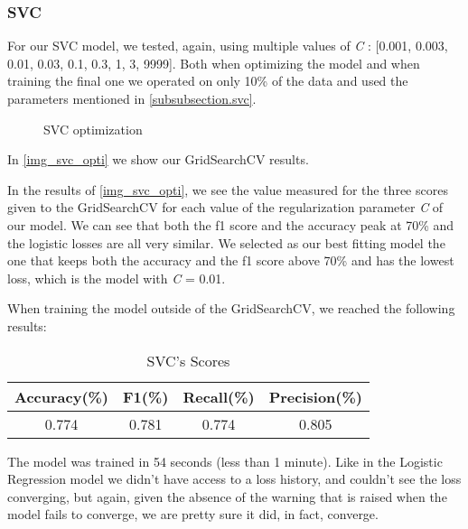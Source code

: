 \documentclass[12pt]{article}
\begin{document}
\subsubsection{SVC}
\label{subsubsection.svc_tunning}
        \par 
        For our SVC model, we tested, again, using multiple values of \textit{C} : [0.001, 0.003, 0.01, 0.03, 0.1, 0.3, 1, 3, 9999].
        Both when optimizing the model and when training the final one we operated on only 10\% of the data and used the parameters mentioned in \autoref{subsubsection.svc}.
    \begin{figure}[!tb]
        \caption{SVC optimization}
        \label{img_svc_opti}
    \end{figure}
        In \autoref{img_svc_opti} we show our GridSearchCV results.
    \par 
        In the results of \autoref{img_svc_opti}, we see the value measured for the three scores given to the GridSearchCV for each value of 
        the regularization parameter \textit{C} of our model. We can see that both the f1 score and the accuracy peak at 70\% and the logistic losses are all 
        very similar. We selected as our best fitting model the one that keeps both the accuracy and the f1 score above 70\% and has the lowest loss, which 
        is the model with \textit{C} = 0.01.
    \par 
        When training the model outside of the GridSearchCV, we reached the following results:
    \begin{center}
        \begin{table}
        \caption{SVC's Scores}
        \begin{center}
        \begin{tabular}{|c |c |c |c|}
            \hline
            Accuracy(\%) & F1(\%) & Recall(\%) & Precision(\%) \\ [0.5ex] 
            \hline
            0.774 & 0.781 & 0.774 & 0.805 \\ 
            \hline
        \end{tabular}
        \label{tab_svm}
        \end{center}
        \end{table}
    \end{center}
    \par 
        The model was trained in 54 seconds (less than 1 minute).
        Like in the Logistic Regression model we didn't have access to a loss history, and couldn't see the loss converging, but again, given the absence 
        of the warning that is raised when the model fails to converge, we are pretty sure it did, in fact, converge.
    
\end{document}
